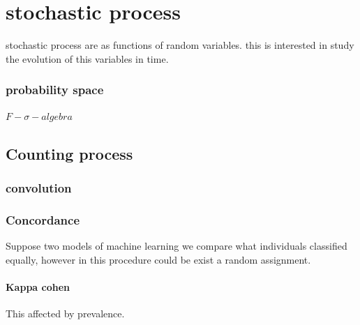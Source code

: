\documentclass[10pt,a4paper]{article}
\begin{document}
\chapter{stochastic process}
stochastic process are as functions of random variables.
this is interested in study the evolution of this variables in time.


\subsection{probability space}

$F-\sigma-algebra$ 










\section{Counting process}






\subsection{convolution}




\subsection{Concordance}
Suppose two models of machine learning we compare what individuals classified equally, however in this procedure could be exist a random assignment. 



\subsubsection{Kappa cohen}
This affected by prevalence.
\end{document}

